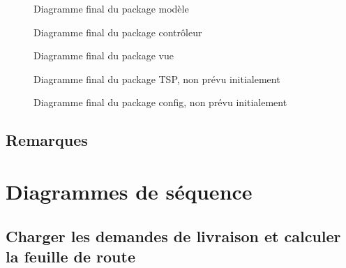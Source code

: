 \documentclass[a4paper]{report}
\newcommand{\adjustimg}{\ifodd\value{page}\hspace*{\dimexpr\evensidemargin-\oddsidemargin}\else\hspace*{-\dimexpr\evensidemargin-\oddsidemargin}\fi}
\newcommand{\centerimg}[2][width=\textwidth]{\makebox[\textwidth]{\adjustimg\texttt{[image: \#2]}}}
\begin{document}
\begin{figure}[H]
    \noindent\centerimg[width=\paperwidth, height=700pt]{images/modelFinal}
    \caption{Diagramme final du package modèle}
\end{figure}

\begin{figure}[H]
    \noindent\centerimg{images/controllerFinal}
    \caption{Diagramme final du package contrôleur}
\end{figure}

\begin{figure}[H]
    \noindent\centerimg{images/viewFinal}
    \caption{Diagramme final du package vue}
\end{figure}

\begin{figure}[H]
    \noindent\centerimg{images/tspFinal}
    \caption{Diagramme final du package TSP, non prévu initialement}
\end{figure}

\begin{figure}[H]
    \noindent\centerimg{images/configFinal}
    \caption{Diagramme final du package config, non prévu initialement}
\end{figure}

\subsection{Remarques}

\pagebreak

\section{Diagrammes de séquence}

\subsection{Charger les demandes de livraison et calculer la feuille de route}
\end{document}
